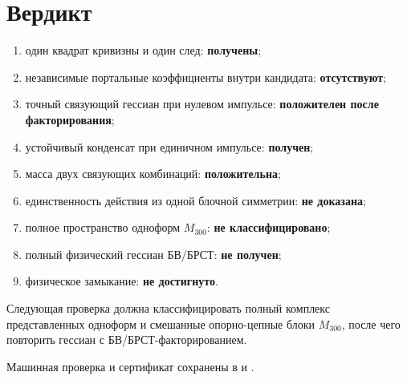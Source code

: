 \section{Вердикт}

\begin{protocol}
\begin{enumerate}
 \item один квадрат кривизны и один след:
 \textbf{получены};
 \item независимые портальные коэффициенты внутри кандидата:
 \textbf{отсутствуют};
 \item точный связующий гессиан при нулевом импульсе:
 \textbf{положителен после факторирования};
 \item устойчивый конденсат при единичном импульсе:
 \textbf{получен};
 \item масса двух связующих комбинаций:
 \textbf{положительна};
 \item единственность действия из одной блочной симметрии:
 \textbf{не доказана};
 \item полное пространство одноформ $M_{300}$:
 \textbf{не классифицировано};
 \item полный физический гессиан БВ/БРСТ:
 \textbf{не получен};
 \item физическое замыкание:
 \textbf{не достигнуто}.
\end{enumerate}
\end{protocol}

Следующая проверка должна классифицировать полный комплекс представленных
одноформ и смешанные опорно-цепные блоки $M_{300}$, после чего повторить
гессиан с БВ/БРСТ-факторированием.

Машинная проверка и сертификат сохранены в
 и
.